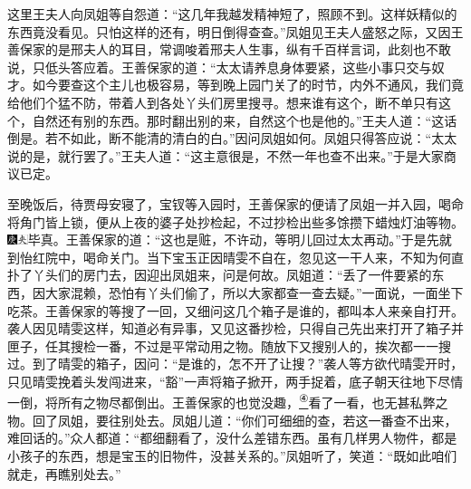 这里王夫人向凤姐等自怨道：``这几年我越发精神短了，照顾不到。这样妖精似的东西竟没看见。只怕这样的还有，明日倒得查查。''凤姐见王夫人盛怒之际，又因王善保家的是邢夫人的耳目，常调唆着邢夫人生事，纵有千百样言词，此刻也不敢说，只低头答应着。王善保家的道：``太太请养息身体要紧，这些小事只交与奴才。如今要查这个主儿也极容易，等到晚上园门关了的时节，内外不通风，我们竟给他们个猛不防，带着人到各处丫头们房里搜寻。想来谁有这个，断不单只有这个，自然还有别的东西。那时翻出别的来，自然这个也是他的。''王夫人道：``这话倒是。若不如此，断不能清的清白的白。''因问凤姐如何。凤姐只得答应说：``太太说的是，就行罢了。''王夫人道：``这主意很是，不然一年也查不出来。''于是大家商议已定。

至晚饭后，待贾母安寝了，宝钗等入园时，王善保家的便请了凤姐一并入园，喝命将角门皆上锁，便从上夜的婆子处抄检起，不过抄检出些多馀攒下蜡烛灯油等物。{\includegraphics[width=3mm]{../Images/00004}\includegraphics[width=3mm]{../Images/00012}\footnotesize \kaishu 毕真。}王善保家的道：``这也是赃，不许动，等明儿回过太太再动。''于是先就到怡红院中，喝命关门。当下宝玉正因晴雯不自在，忽见这一干人来，不知为何直扑了丫头们的房门去，因迎出凤姐来，问是何故。凤姐道：``丢了一件要紧的东西，因大家混赖，恐怕有丫头们偷了，所以大家都查一查去疑。''一面说，一面坐下吃茶。王善保家的等搜了一回，又细问这几个箱子是谁的，都叫本人来亲自打开。袭人因见晴雯这样，知道必有异事，又见这番抄检，只得自己先出来打开了箱子并匣子，任其搜检一番，不过是平常动用之物。随放下又搜别人的，挨次都一一搜过。到了晴雯的箱子，因问：``是谁的，怎不开了让搜？''袭人等方欲代晴雯开时，只见晴雯挽着头发闯进来，``豁''一声将箱子掀开，两手捉着，底子朝天往地下尽情一倒，将所有之物尽都倒出。王善保家的也觉没趣，\href{../Text/part0078_split_000.html\#lnkback_4_a}{\textsuperscript{④}}看了一看，也无甚私弊之物。回了凤姐，要往别处去。凤姐儿道：``你们可细细的查，若这一番查不出来，难回话的。''众人都道：``都细翻看了，没什么差错东西。虽有几样男人物件，都是小孩子的东西，想是宝玉的旧物件，没甚关系的。''凤姐听了，笑道：``既如此咱们就走，再瞧别处去。''

